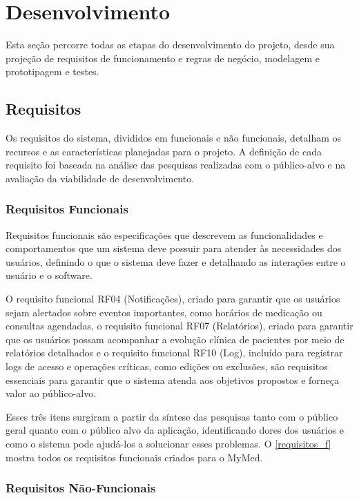 \documentclass[
	article,			%
	12pt,				%
	oneside,			%
	a4paper,			%
    BIBLATEX,           %
	english,			%
	brazil,				%
	sumario=tradicional
	]{abntex2}
\newcommand\nomeprojeto{MyMed}
\begin{document}
\section{Desenvolvimento}

Esta seção percorre todas as etapas do desenvolvimento do projeto, desde sua projeção de requisitos de funcionamento e regras de negócio, modelagem e prototipagem e testes.

\subsection{Requisitos}

Os requisitos do sistema, divididos em funcionais e não funcionais, detalham os recursos e as características planejadas para o projeto. A definição de cada requisito foi baseada na análise das pesquisas realizadas com o público-alvo e na avaliação da viabilidade de desenvolvimento.

\subsubsection{Requisitos Funcionais}

Requisitos funcionais são especificações que descrevem as funcionalidades e comportamentos que um sistema deve possuir para atender às necessidades dos usuários, definindo o que o sistema deve fazer e detalhando as interações entre o usuário e o software.

O requisito funcional RF04 (Notificações), criado para garantir que os usuários sejam alertados sobre eventos importantes, como horários de medicação ou consultas agendadas, o requisito funcional RF07 (Relatórios), criado para garantir que os usuários possam acompanhar a evolução clínica de pacientes por meio de relatórios detalhados e o requisito funcional RF10 (Log), incluído para registrar logs de acesso e operações críticas, como edições ou exclusões, são requisitos essenciais para garantir que o sistema atenda aos objetivos propostos e forneça valor ao público-alvo. 

Esses três itens surgiram a partir da síntese das pesquisas tanto com o público geral quanto com o público alvo da aplicação, identificando dores dos usuários e como o sistema pode ajudá-los a solucionar esses problemas. O \autoref{requisitos_f} mostra todos os requisitos funcionais criados para o \nomeprojeto.

\subsubsection{Requisitos Não-Funcionais}
\end{document}
